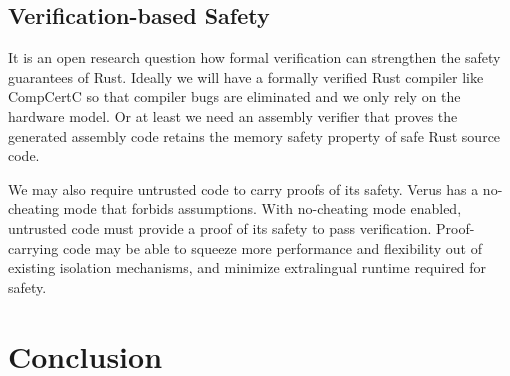 \documentclass[conference]{IEEEtran}
\begin{document}
\subsection{Verification-based Safety}
It is an open research question how formal verification can strengthen the safety guarantees of Rust. 
Ideally we will have a formally verified Rust compiler like CompCertC so that compiler bugs are eliminated and we only rely on the hardware model. Or at least we need an assembly verifier that proves the generated assembly code retains the memory safety property of safe Rust source code.   

We may also require untrusted code to carry proofs of its safety. Verus has a no-cheating mode that forbids assumptions. With no-cheating mode enabled, untrusted code must provide a proof of its safety to pass verification. Proof-carrying code may be able to squeeze more performance and flexibility out of existing isolation mechanisms, and minimize extralingual runtime required for safety. 

\section{Conclusion}
\printbibliography
\end{document}
